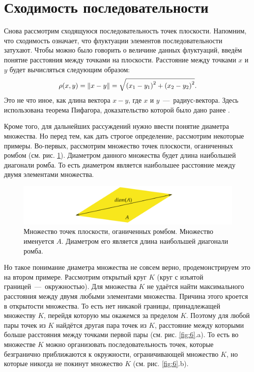\documentclass[12pt]{article}
\begin{document}
\section{Сходимость последовательности}
Снова рассмотрим сходящуюся последовательность точек плоскости. Напомним, что сходимость означает, что флуктуации элементов последовательности затухают. Чтобы можно было говорить о величине данных флуктуаций, введём понятие расстояния между точками на плоскости. Расстояние между точками $x$ и $y$ будет вычисляться следующим образом:
\begin{equation}
    \rho\qty(x,y)=\norm{x-y} = \sqrt{\qty(x_1 - y_1)^2 + \qty(x_2 - y_2)^2}.
\end{equation}
Это не что иное, как длина вектора $x-y$, где $x$ и $y$~\----~радиус\--вектора. Здесь использована теорема Пифагора, доказательство которой было дано ранее \cite{pif}.
\par
Кроме того, для дальнейших рассуждений нужно ввести понятие диаметра множества. Но перед тем, как дать строгое определение, рассмотрим некоторые примеры. Во\--первых, рассмотрим множество точек плоскости, оганиченных ромбом (см. рис. \ref{fig:5}). Диаметром данного множества будет длина наибольшей диагонали ромба. То есть диаметром является наибольшее расстояние между двумя элементами множества.
\begin{figure}[ht]
    \centering
    \includegraphics[width = 1\textwidth]{fig5.png}
    \caption{Множество точек плоскости, оганиченных ромбом. Множество именуется $A$. Диаметром его является длина наибольшей диагонали ромба.}
    \label{fig:5}
\end{figure}
\par
Но такое понимание диаметра множества не совсем верно, продемонстрируем это на втором примере. Рассмотрим открытый круг $K$ (круг с изъятой границей~\----~окружностью). Для множества $K$ не удаётся найти максимального расстояния между двумя любыми элементами множества. Причина этого кроется в открытости множества. То есть нет никакой границы, принадлежащей множеству $K$, перейдя которую мы окажемся за пределом $K$. Поэтому для любой пары точек из $K$ найдётся другая пара точек из $K$, расстояние между которыми больше расстояния между точками первой пары (см. рис. \ref{fig:6}.a). То есть во множестве $K$ можно организовать последовательность точек, которые безгранично приближаются к окружности, ограничивающей множество $K$, но которые никогда не покинут множество $K$ (см. рис. \ref{fig:6}.b).
\end{document}
